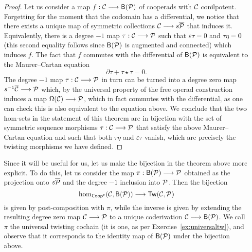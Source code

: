 \begin{proof}
Let us consider a map $f : \mathcal{C} \longrightarrow \mathsf{B}({\mathcal{P}})$ of cooperads
with $\mathcal{C}$ conilpotent. Forgetting for the moment that the codomain
has a differential, we notice that there exists a unique map of
symmetric collections $\mathcal{C} \longrightarrow s\overline{{\mathcal{P}}}$
that induces it. Equivalently, there is a degree $-1$ map
$\tau : \mathcal{C} \longrightarrow {\mathcal{P}}$ such that $\varepsilon\tau = 0$
and $\tau\eta = 0$ (this second equality follows since $\mathsf{B}({\mathcal{P}})$ is
augmented and connected)
which induces $f$. The fact that $f$ commutes with the differential of
$\mathsf{B}({\mathcal{P}})$ is equivalent to the Maurer--Cartan equation
\[
\partial \tau + \tau\star\tau = 0.
\]
The degree $-1$ map $\tau : \mathcal{C}\longrightarrow {\mathcal{P}}$ in turn can
be turned into a degree zero map $s^{-1}\overline{\mathcal{C}}\longrightarrow
{\mathcal{P}}$ which, by the universal property of the free operad construction
induces a map $\Omega(\mathcal{C}) \longrightarrow {\mathcal{P}}$, which in fact commutes with
the differential, as one can check this is also equivalent
to the equation above. We conclude that the two hom-sets in
the statement of this theorem are in bijection with the set
of symmetric sequence morphisms $\tau : \mathcal{C}\longrightarrow {\mathcal{P}}$
that satisfy the above Maurer--Cartan equation and
such that both $\tau\eta$ and $\varepsilon\tau$ vanish,
which are precisely the twisting morphisms we have defined.
\end{proof}

Since it will be useful for us, let us make the bijection
in the theorem above more explicit. To do this, let us consider
the map $\pi : \mathsf{B}({\mathcal{P}}) \longrightarrow {\mathcal{P}}$ obtained
as the projection onto $s\overline{{\mathcal{P}}}$ and the degree
$-1$ inclusion into ${\mathcal{P}}$. Then the bijection
\[
\hom_{\mathsf{Coop}^c}(\mathcal{C},\mathsf{B}({\mathcal{P}}))
 	\longrightarrow
 	 \mathsf{Tw}(\mathcal{C},{\mathcal{P}})
\]
is given by post-composition with $\pi$, while the
inverse is given by extending the
resulting degree zero map 
$\mathcal{C}\longrightarrow {\mathcal{P}}$ to a unique coderivation
$\mathcal{C}\longrightarrow \mathsf{B}({\mathcal{P}})$. We call $\pi$
the universal twisting cochain (it is one, as per
Exercise~\ref{ex:universaltw}), and observe that it
corresponds to the identity map of $\mathsf{B}({\mathcal{P}})$ under
the bijection above. 

